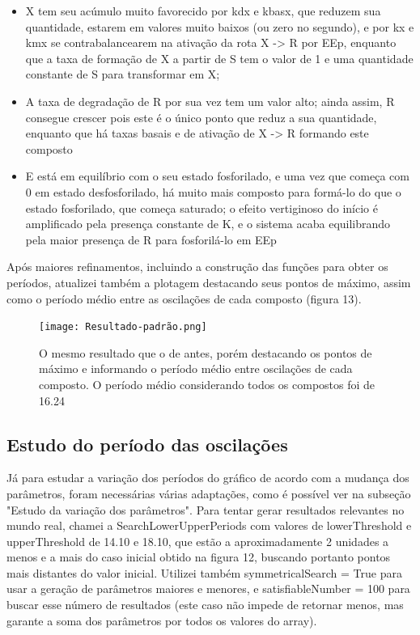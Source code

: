 \documentclass[brazilian,12pt,a4paper,final]{article}
\begin{document}
	\begin{itemize}
		\item X tem seu acúmulo muito favorecido por kdx e kbasx, que reduzem sua quantidade, estarem em valores muito baixos (ou zero no segundo), e por kx e kmx se contrabalancearem na ativação da rota X -> R por EEp, enquanto que a taxa de formação de X a partir de S tem o valor de 1 e uma quantidade constante de S para transformar em X;  
		\item A taxa de degradação de R por sua vez tem um valor alto; ainda assim, R consegue crescer pois este é o único ponto que reduz a sua quantidade, enquanto que há taxas basais e de ativação de X -> R formando este composto
		\item E está em equilíbrio com o seu estado fosforilado, e uma vez que começa com 0 em estado desfosforilado, há muito mais composto para formá-lo do que o estado fosforilado, que começa saturado; o efeito vertiginoso do início é amplificado pela presença constante de K, e o sistema acaba equilibrando pela maior presença de R para fosforilá-lo em EEp
	\end{itemize}

	Após maiores refinamentos, incluindo a construção das funções para obter os períodos, atualizei também a plotagem destacando seus pontos de máximo, assim como o período médio entre as oscilações de cada composto (figura 13). 
	
	\begin{figure}[hbtp]
		\begin{center}
			\texttt{[image: Resultado-padrão.png]}
			\caption{O mesmo resultado que o de antes, porém destacando os pontos de máximo e informando o período médio entre oscilações de cada composto. O período médio considerando todos os compostos foi de 16.24}
			\label{fig}
		\end{center}
	\end{figure}
	
	\subsection{Estudo do período das oscilações}
	
	Já para estudar a variação dos períodos do gráfico de acordo com a mudança dos parâmetros, foram necessárias várias adaptações, como é possível ver na subseção "Estudo da variação dos parâmetros".
	Para tentar gerar resultados relevantes no mundo real, chamei a SearchLowerUpperPeriods com valores de lowerThreshold e upperThreshold de 14.10 e 18.10, que estão a aproximadamente 2 unidades a menos e a mais do caso inicial obtido na figura 12, buscando portanto pontos mais distantes do valor inicial. Utilizei também symmetricalSearch = True para usar a geração de parâmetros maiores e menores, e satisfiableNumber = 100 para buscar esse número de resultados (este caso não impede de retornar menos, mas garante a soma dos parâmetros por todos os valores do array).
	\vspace{0.5cm}
	
\end{document}
